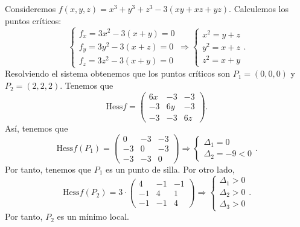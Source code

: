 \begin{eg}
Consideremos $\displaystyle f\left(x,y,z\right) = x^{3}+y^{3}+z^{3}-3\left(xy + xz + yz\right) $. Calculemos los puntos críticos:
\[
\begin{cases}
f_{x} = 3x^{2} - 3\left(x+y\right) = 0 \\
f_{y} = 3y^{2} - 3\left(x+z\right) = 0 \\
f_{z} = 3z^{2}-3\left(x + y \right) = 0
\end{cases} \Rightarrow
\begin{cases}
x^{2} = y + z \\
y^{2} = x + z \\
z^{2} = x + y
\end{cases}
.\]
Resolviendo el sistema obtenemos que los puntos críticos son $\displaystyle P_{1} = \left(0,0,0\right) $ y $\displaystyle P_{2} = \left(2,2,2\right) $. Tenemos que 
\[\text{Hess}f = \begin{pmatrix} 6x & - 3 & - 3 \\ - 3 & 6y & -3 \\ -3 & - 3 & 6z \end{pmatrix} .\]
Así, tenemos que 
\[\text{Hess}f\left(P_{1}\right)= \begin{pmatrix} 0 & -3 & -3 \\ -3 & 0 & - 3 \\ -3 & - 3 & 0 \end{pmatrix} \Rightarrow 
\begin{cases}
\Delta_{1} = 0 \\
\Delta_{2} = -9 < 0
\end{cases}
.\]
Por tanto, tenemos que $\displaystyle P_{1} $ es un punto de silla. Por otro lado, 
\[\text{Hess}f\left(P_{2}\right) = 3 \cdot \begin{pmatrix} 4 & - 1 & - 1 \\ - 1 & 4 & 1 \\ - 1 & - 1 & 4 \end{pmatrix} \Rightarrow 
\begin{cases}
\Delta_{1} > 0 \\
\Delta_{2} > 0 \\
\Delta_{3} > 0
\end{cases}
.\]
Por tanto, $\displaystyle P_{2} $ es un mínimo local. 
\end{eg}

